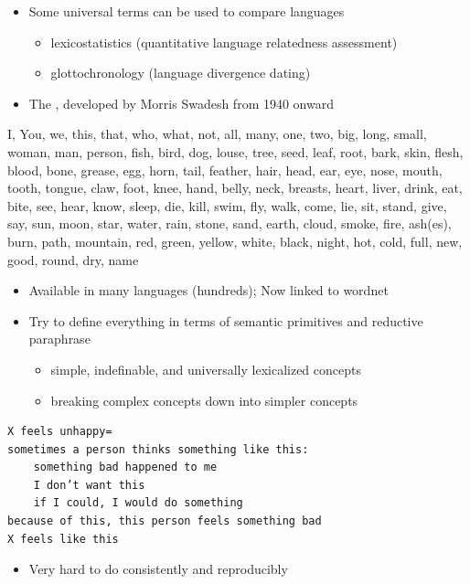 \documentclass[headrule,footrule]{foils}
\begin{document}
\begin{itemize}
\item Some universal terms can be used to compare languages
  \begin{itemize}
  \item lexicostatistics (quantitative language relatedness assessment)
  \item glottochronology (language divergence dating)
\end{itemize}
\item The , developed by Morris Swadesh from 1940 onward 
\end{itemize}
\vspace*{-2ex}
I, You, we, this, that, who, what, not, all, many, one, two, big,
long, small, woman, man, person, fish, bird, dog, louse, tree, seed,
leaf, root, bark, skin, flesh, blood, bone, grease, egg, horn, tail,
feather, hair, head, ear, eye, nose, mouth, tooth, tongue, claw, foot,
knee, hand, belly, neck, breasts, heart, liver, drink, eat, bite, see,
hear, know, sleep, die, kill, swim, fly, walk, come, lie, sit, stand,
give, say, sun, moon, star, water, rain, stone, sand, earth, cloud,
smoke, fire, ash(es), burn, path, mountain, red, green, yellow, white,
black, night, hot, cold, full, new, good, round, dry, name
\vspace*{-1ex}
\begin{itemize}
\item Available in many languages (hundreds); Now linked to wordnet 
\end{itemize}
\vspace*{-1ex}


\begin{itemize}
\item Try to define everything in terms of semantic primitives and reductive paraphrase
  \begin{itemize}
  \item simple, indefinable, and universally lexicalized concepts
  \item breaking complex concepts down into simpler concepts
  \end{itemize}
\end{itemize}
\begin{verbatim}
X feels unhappy=
sometimes a person thinks something like this:
    something bad happened to me
    I don’t want this	
    if I could, I would do something
because of this, this person feels something bad
X feels like this
\end{verbatim}
\begin{itemize}
\item Very hard to do consistently and reproducibly
\end{itemize}
\end{document}
